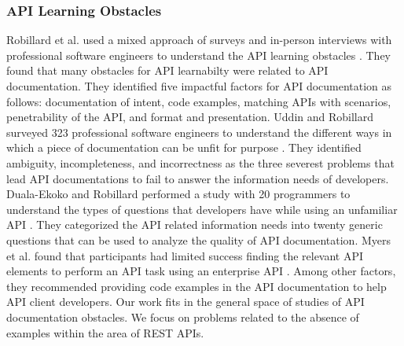 \documentclass[conference]{IEEEtran}
\begin{document}
\subsubsection{API Learning Obstacles}
Robillard et al. used a mixed approach of surveys and in-person interviews with professional software engineers to understand the API learning obstacles \cite{Robillard_what_makes} \cite{Robillard_a_field_study}. They found that many obstacles for API learnabilty were related to API documentation. They identified five impactful factors for API documentation as follows: documentation of intent, code examples, matching APIs with scenarios, penetrability of the API, and format and presentation. Uddin and Robillard surveyed 323 professional software engineers to understand the different ways in which a piece of documentation can be unfit for purpose \cite{g_uddin}. They identified ambiguity, incompleteness, and incorrectness as the three severest problems that lead API documentations to fail to answer the information needs of developers. Duala-Ekoko and Robillard performed a study with 20 programmers to understand the types of questions that developers have while using an unfamiliar API \cite{Duala-Ekoko:2012:AAQ:2337223.2337255}. They categorized the API related information needs into twenty generic questions that can be used to analyze the quality of API documentation. Myers et al. found that participants had limited success finding the relevant API elements to perform an API task using an enterprise API \cite{Myers_study}. Among other factors, they recommended providing code examples in the API documentation to help API client developers. Our work fits in the general space of studies of API documentation obstacles. We focus on problems related to the absence of examples within the area of REST APIs.
\end{document}
